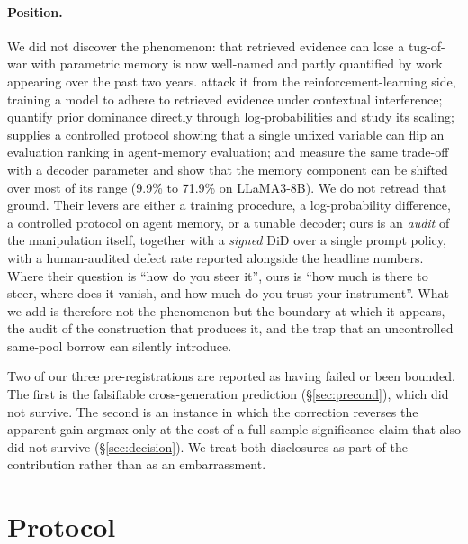 \documentclass[11pt]{article}
\begin{document}
\paragraph{Position.}
We did not discover the phenomenon: that retrieved evidence can lose a tug-of-war
with parametric memory is now well-named and partly quantified by work appearing
over the past two years. \citet{knowledgeable_r1} attack it from the
reinforcement-learning side, training a model to adhere to retrieved evidence
under contextual interference; \citet{prior_dominance} quantify prior dominance
directly through log-probabilities and study its scaling; \citet{memdelta}
supplies a controlled protocol showing that a single unfixed variable can flip an
evaluation ranking in agent-memory evaluation; and \citet{bi2026parameters}
measure the same trade-off with a decoder parameter and show that the memory
component can be shifted over most of its range (9.9\% to 71.9\% on
{LLaMA3-8B}). We do not retread that ground. Their levers are either a training
procedure, a log-probability difference, a controlled protocol on agent memory,
or a tunable decoder; ours is an \emph{audit} of the manipulation itself,
together with a \emph{signed} DiD over a single prompt policy, with a human-audited
defect rate reported alongside the headline numbers. Where their question is
``how do you steer it'', ours is ``how much is there to steer, where does it
vanish, and how much do you trust your instrument''. What we add is therefore not the
phenomenon but the boundary at which it appears, the audit of the construction that
produces it, and the trap that an uncontrolled same-pool borrow can silently introduce.

Two of our three pre-registrations are reported as having failed or been bounded.
The first is the falsifiable cross-generation prediction (\S\ref{sec:precond}), which did not
survive. The second is an instance in which the correction reverses the apparent-gain
argmax only at the cost of a full-sample significance claim that also did not survive
(\S\ref{sec:decision}). We treat both disclosures as part of the contribution rather than as
an embarrassment.

\section{Protocol}
\label{sec:protocol}
\end{document}
